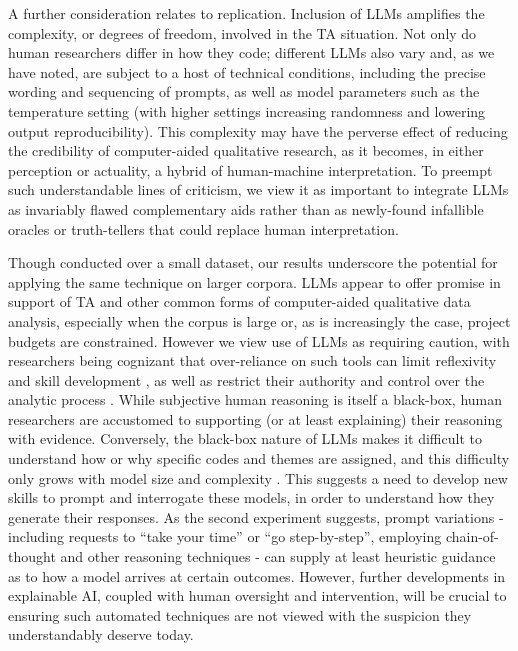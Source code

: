 \documentclass{article}
\begin{document}
A further consideration relates to replication. Inclusion of LLMs amplifies the complexity, or degrees of freedom, involved in the TA situation. Not only do human researchers differ in how they code; different LLMs also vary and, as we have noted, are subject to a host of technical conditions, including the precise wording and sequencing of prompts, as well as model parameters such as the temperature setting (with higher settings increasing randomness and lowering output reproducibility). This complexity may have the perverse effect of reducing the credibility of computer-aided qualitative research, as it becomes, in either perception or actuality, a hybrid of human-machine interpretation. To preempt such understandable lines of criticism, we view it as important to integrate LLMs as invariably flawed complementary aids rather than as newly-found infallible oracles or truth-tellers that could replace human interpretation.


Though conducted over a small dataset, our results underscore the potential for applying the same technique on larger corpora. LLMs appear to offer promise in support of TA and other common forms of computer-aided qualitative data analysis, especially when the corpus is large or, as is increasingly the case, project budgets are constrained. However we view use of LLMs as requiring caution, with researchers being cognizant that over-reliance on such tools can limit reflexivity and skill development \cite{braunOneSizeFits2021}, as well as restrict their authority and control over the analytic process \cite{nowellThematicAnalysisStriving2017}. While subjective human reasoning is itself a black-box, human researchers are accustomed to supporting (or at least explaining) their reasoning with evidence. Conversely, the black-box nature of LLMs makes it difficult to understand how or why specific codes and themes are assigned, and this difficulty only grows with model size and complexity \cite{carabantesBlackboxArtificialIntelligence2020}. This suggests a need to develop new skills to prompt and interrogate these models, in order to understand how they generate their responses. As the second experiment suggests, prompt variations - including requests to ``take your time'' or ``go step-by-step'', employing chain-of-thought and other reasoning techniques - can supply at least heuristic guidance as to how a model arrives at certain outcomes. However, further developments in explainable AI, coupled with human oversight and intervention, will be crucial to ensuring such automated techniques are not viewed with the suspicion they understandably deserve today.
\end{document}
